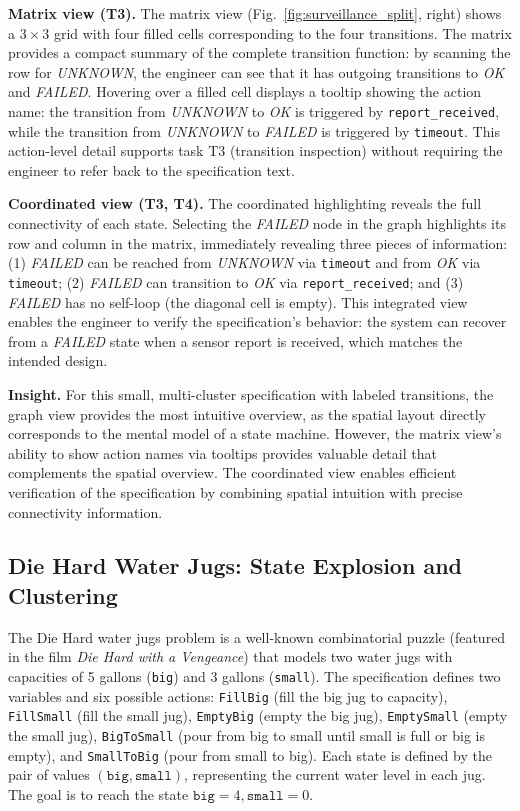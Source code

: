 \documentclass[conference]{IEEEtran}
\begin{document}
\textbf{Matrix view (T3).} The matrix view (Fig.~\ref{fig:surveillance_split}, right) shows a $3 \times 3$ grid with four filled cells corresponding to the four transitions. The matrix provides a compact summary of the complete transition function: by scanning the row for \textit{UNKNOWN}, the engineer can see that it has outgoing transitions to \textit{OK} and \textit{FAILED}. Hovering over a filled cell displays a tooltip showing the action name: the transition from \textit{UNKNOWN} to \textit{OK} is triggered by \texttt{report\_received}, while the transition from \textit{UNKNOWN} to \textit{FAILED} is triggered by \texttt{timeout}. This action-level detail supports task T3 (transition inspection) without requiring the engineer to refer back to the specification text.

\textbf{Coordinated view (T3, T4).} The coordinated highlighting reveals the full connectivity of each state. Selecting the \textit{FAILED} node in the graph highlights its row and column in the matrix, immediately revealing three pieces of information: (1) \textit{FAILED} can be reached from \textit{UNKNOWN} via \texttt{timeout} and from \textit{OK} via \texttt{timeout}; (2) \textit{FAILED} can transition to \textit{OK} via \texttt{report\_received}; and (3) \textit{FAILED} has no self-loop (the diagonal cell is empty). This integrated view enables the engineer to verify the specification's behavior: the system can recover from a \textit{FAILED} state when a sensor report is received, which matches the intended design.

\textbf{Insight.} For this small, multi-cluster specification with labeled transitions, the graph view provides the most intuitive overview, as the spatial layout directly corresponds to the mental model of a state machine. However, the matrix view's ability to show action names via tooltips provides valuable detail that complements the spatial overview. The coordinated view enables efficient verification of the specification by combining spatial intuition with precise connectivity information.

\subsection{Die Hard Water Jugs: State Explosion and Clustering}

The Die Hard water jugs problem is a well-known combinatorial puzzle (featured in the film \textit{Die Hard with a Vengeance}) that models two water jugs with capacities of 5 gallons (\texttt{big}) and 3 gallons (\texttt{small}). The specification defines two variables and six possible actions: \texttt{FillBig} (fill the big jug to capacity), \texttt{FillSmall} (fill the small jug), \texttt{EmptyBig} (empty the big jug), \texttt{EmptySmall} (empty the small jug), \texttt{BigToSmall} (pour from big to small until small is full or big is empty), and \texttt{SmallToBig} (pour from small to big). Each state is defined by the pair of values $(\mathtt{big}, \mathtt{small})$, representing the current water level in each jug. The goal is to reach the state $\mathtt{big}=4, \mathtt{small}=0$.
\end{document}
